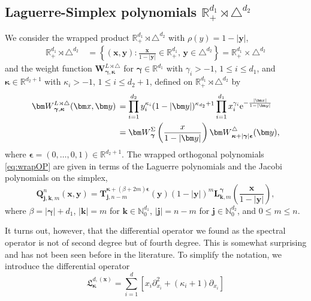 \documentclass{amsart}
\theoremstyle{remark}
\def\e{\mathrm{e}}
\def\fL{{\mathfrak L}}
\def\b{{\beta}}
\def\g{{\gamma}}
\def\k{{\kappa}}
\def\xb{{\bm x}}
\def\yb{{\bm y}}
\def\Tb{{\bm T}}
\def\Wb{{\bm W}}
\def\NN{{\mathbb N}}
\def\RR{{\mathbb R}}
\def\bep{{\boldsymbol{\epsilon}}}
\def\bg{{\boldsymbol{\gamma}}}
\def\bk{{\boldsymbol{\kappa}}}
\begin{document}
\subsection{Laguerre-Simplex polynomials $\RR_+^{d_1}  \rtimes \triangle^{d_2}$}
We consider the wrapped product  $\RR_+^{d_1}  \rtimes \triangle^{d_2}$ with $\rho(y) = 1-|\yb|$, 
\begin{align*}
\RR_+^{d_1} \rtimes \triangle^{d_2} \, & = \left\{(\xb,\yb): \frac{\xb}{1-|\yb|} \in  \RR_+^{d_1},  \, \yb \in  \triangle^{d_2}\right\} 
=\RR_+^{d_1} \times \triangle^{d_2}
\end{align*}
and the weight function $\Wb_{\bg, \bk}^{L \rtimes \triangle}$ for $\bg \in \RR^{d_1}$ with $\g_i > -1$, $1 \le i \le d_1$, and 
$\bk \in \RR^{d_2+1}$ with $\k_i > -1$, $1\le i \le d_2+1$, defined on $\RR_+^{d_1}  \rtimes \triangle^{d_2}$ by  
\begin{align} \label{eq:W-TSig}
\Wb_{\bg, \bk}^{L \rtimes \triangle}(\xb,\yb) \, & =\prod_{i=1}^{d_2} y_i^{\k_i}
     (1 - |\bm y | )^{\k_{d_2}+1}  \prod_{i=1}^{d_1} x_i^{\g_i}   \e^{- \frac{|\xb|}{1-|\yb|}}\\
  & =  \Wb_{\bg}^\Sigma \left( \frac{x}{1- |\bm y|} \right)\Wb_{\bk + |\bg| \bep}^{\triangle}(\yb), \notag
\end{align}
where $\bep = (0,\ldots,0,1) \in \RR^{d_2 +1}$. The wrapped orthogonal polynomials \eqref{eq:wrapOP} are given
in terms of the Laguerre polynomials and the Jacobi polynomials on the simplex, 
 \begin{equation} \label{eq:OP_TSig}
 \bm Q_{\bm j, \bm k, m}^n(\bm x,\bm y) = \Tb_{\bm j, n-m}^{\bk+(\b+2m)\bep}(\bm y) (1-|\bm y|)^m 
      \bm L_{\bm k, m}^{\bg} \left(\frac{\bm x}{1- |\bm y|}\right),
\end{equation}
where $\b = |\bg|+ d_1$, $|\bm k| = m$ for $\bm k \in \NN_0^{d_1}$, $|\bm j| = n-m$ for $\bm j \in \NN_0^{d_2}$, 
and $0 \le m  \le n$. 

It turns out, however, that the differential operator we found as the spectral operator is not of second degree but of
fourth degree. This is somewhat surprising and has not been seen before in the literature. To simplify the notation,
we introduce the differential operator 
$$
  \fL_\bk^{d, (\xb)} =  \sum_{i=1}^d \left[ x_i \partial_{x_i}^2 + (\k_i+1) \partial_{x_i} \right]
$$
\end{document}
